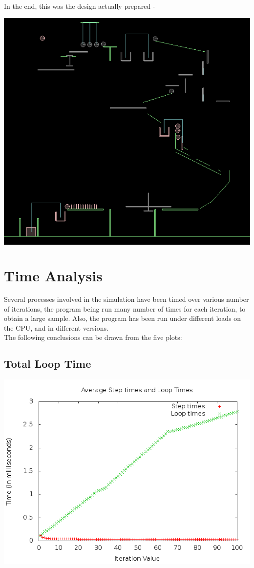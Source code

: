 \documentclass[a4paper,11pt]{article}
\begin{document}
		In the end, this was the design actually prepared -
			\begin{center}
				\includegraphics[scale=0.7]{./doc/images/final_design.png}
			\end{center}
	
	\section{Time Analysis}
		Several processes involved in the simulation have been timed over various
		number of iterations, the program being run many number of times for each
		iteration, to obtain a large sample. Also, the program has been run under
		different loads on the CPU, and in different versions.\\
		The following conclusions can be drawn from the five plots:
		
		\subsection{Total Loop Time}
			\begin{center}
				\includegraphics[scale=0.5]{./doc/images/g16_plot01.png}
			\end{center}
			
\end{document}
